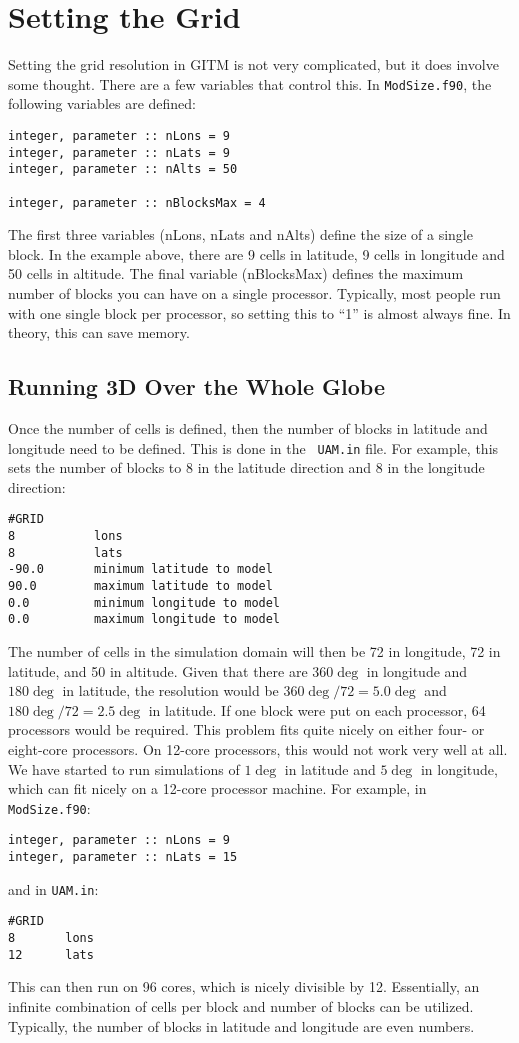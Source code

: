 
\section{Setting the Grid}

Setting the grid resolution in GITM is not very complicated, but it
does involve some thought.  There are a few variables that control
this.  In {\tt ModSize.f90}, the following variables are defined:

\begin{verbatim}
integer, parameter :: nLons = 9
integer, parameter :: nLats = 9
integer, parameter :: nAlts = 50

integer, parameter :: nBlocksMax = 4
\end{verbatim}

The first three variables (nLons, nLats and nAlts) define the size of
a single block.  In the example above, there are 9 cells in latitude,
9 cells in longitude and 50 cells in altitude.  The final variable
(nBlocksMax) defines the maximum number of blocks you can have on a
single processor.  Typically, most people run with one single block
per processor, so setting this to ``1'' is almost always fine.  In
theory, this can save memory.

\subsection{Running 3D Over the Whole Globe}

Once the number of cells is defined, then the number of blocks in
latitude and longitude need to be defined.  This is done in the {\tt
  UAM.in} file.  For example, this sets the number of blocks to 8 in
the latitude direction and 8 in the longitude direction:
\begin{verbatim}
#GRID
8           lons
8           lats
-90.0       minimum latitude to model
90.0        maximum latitude to model
0.0         minimum longitude to model
0.0         maximum longitude to model
\end{verbatim}
The number of cells in the simulation domain will then be 72 in
longitude, 72 in latitude, and 50 in altitude.  Given that there are
360$\deg$ in longitude and $180\deg$ in latitude, the resolution would
be $360\deg/72 = 5.0\deg$ and $180\deg/72 = 2.5\deg$ in latitude.  If
one block were put on each processor, 64 processors would be required.
This problem fits quite nicely on either four- or eight-core
processors.  On 12-core processors, this would not work very well at
all.  We have started to run simulations of $1\deg$ in latitude and
$5\deg$ in longitude, which can fit nicely on a 12-core processor
machine.  For example, in {\tt ModSize.f90}:
\begin{verbatim}
integer, parameter :: nLons = 9
integer, parameter :: nLats = 15
\end{verbatim}
and in {\tt UAM.in}:
\begin{verbatim}
#GRID
8		lons
12		lats
\end{verbatim}
This can then run on 96 cores, which is nicely divisible by 12.
Essentially, an infinite combination of cells per block and number of
blocks can be utilized.  Typically, the number of blocks in latitude
and longitude are even numbers.

